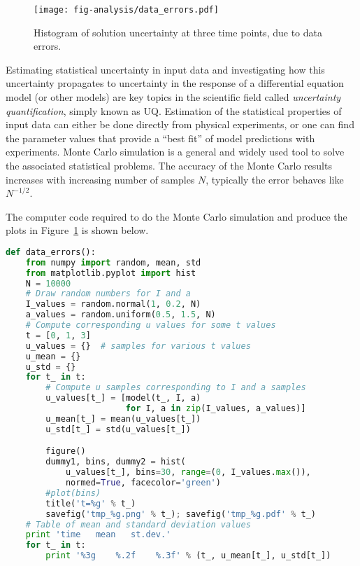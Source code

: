 \documentclass[graybox,sectrefs,envcountresetchap,open=right,final]{svmonodo}
\begin{document}
\begin{figure}[!ht]  %
  \centerline{\texttt{[image: fig-analysis/data\_errors.pdf]}}
  \caption{
  Histogram of solution uncertainty at three time points, due to data errors. \label{decay:analysis:data_errors:fig}
  }
\end{figure}




Estimating statistical uncertainty in input data and investigating how
this uncertainty propagates to uncertainty in the response of a
differential equation model (or other models) are key topics in the
scientific field called \emph{uncertainty quantification}, simply known as
UQ.  Estimation of the statistical properties of input data can either
be done directly from physical experiments, or one can find the
parameter values that provide a ``best fit'' of model predictions with
experiments. Monte Carlo simulation is a general and widely used tool
to solve the associated statistical problems.  The accuracy of the
Monte Carlo results increases with increasing number of samples $N$,
typically the error behaves like $N^{-1/2}$.

The computer code required to do the Monte Carlo simulation and
produce the plots in Figure~\ref{decay:analysis:data_errors:fig}
is shown below.

\begin{lstlisting}[language=Python,style=blue1_bluegreen]
def data_errors():
    from numpy import random, mean, std
    from matplotlib.pyplot import hist
    N = 10000
    # Draw random numbers for I and a
    I_values = random.normal(1, 0.2, N)
    a_values = random.uniform(0.5, 1.5, N)
    # Compute corresponding u values for some t values
    t = [0, 1, 3]
    u_values = {}  # samples for various t values
    u_mean = {}
    u_std = {}
    for t_ in t:
        # Compute u samples corresponding to I and a samples
        u_values[t_] = [model(t_, I, a)
                        for I, a in zip(I_values, a_values)]
        u_mean[t_] = mean(u_values[t_])
        u_std[t_] = std(u_values[t_])

        figure()
        dummy1, bins, dummy2 = hist(
            u_values[t_], bins=30, range=(0, I_values.max()),
            normed=True, facecolor='green')
        #plot(bins)
        title('t=%g' % t_)
        savefig('tmp_%g.png' % t_); savefig('tmp_%g.pdf' % t_)
    # Table of mean and standard deviation values
    print 'time   mean   st.dev.'
    for t_ in t:
        print '%3g    %.2f    %.3f' % (t_, u_mean[t_], u_std[t_])
\end{lstlisting}
\end{document}
